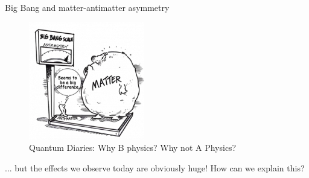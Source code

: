 \documentclass{beamer}
\begin{document}
\begin{frame}{Big Bang and matter-antimatter asymmetry}
  \begin{figure}
    \includegraphics[width=0.45\textwidth]{Plots/MatterAntimatterBigAsymmetry.png}
    \caption*{\tiny Quantum Diaries: Why B physics? Why not A Physics?}
  \end{figure}
  \vspace{-0.5cm}
  \begin{center}
    \Large ... but the effects we observe today are obviously huge! How can we explain this?
  \end{center}
\end{frame}
\end{document}
